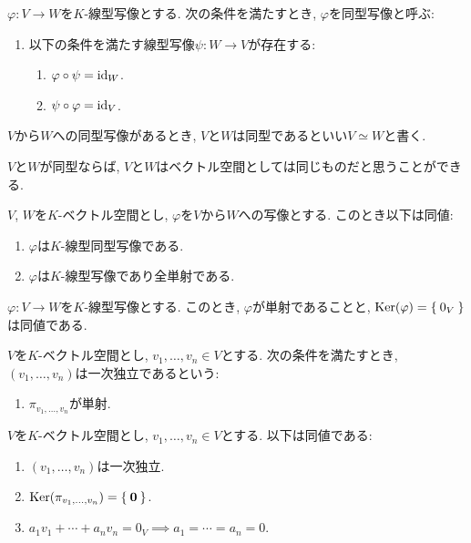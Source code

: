 \begin{definition}
  $\varphi\colon V\to W$を$K$-線型写像とする.
  次の条件を満たすとき, $\varphi$を同型写像と呼ぶ:
  \begin{enumerate}
  \item 以下の条件を満たす線型写像$\psi\colon W\to V$が存在する:
    \begin{enumerate}
      \item $\varphi\circ \psi=\operatorname{id}_W$.
      \item $\psi\circ \varphi=\operatorname{id}_V$.
    \end{enumerate}
  \end{enumerate}
  $V$から$W$への同型写像があるとき,
  $V$と$W$は同型であるといい$V\simeq W$と書く.
\end{definition}

\begin{remark}
  $V$と$W$が同型ならば,
  $V$と$W$はベクトル空間としては同じものだと思うことができる.
\end{remark}
\begin{prop}
  $V$, $W$を$K$-ベクトル空間とし,
  $\varphi$を$V$から$W$への写像とする.
  このとき以下は同値:
  \begin{enumerate}
  \item $\varphi$は$K$-線型同型写像である.
  \item $\varphi$は$K$-線型写像であり全単射である.
  \end{enumerate}
\end{prop}
\begin{prop}
  $\varphi\colon V\to W$を$K$-線型写像とする.
  このとき, $\varphi$が単射であることと,
  $\operatorname{Ker}(\varphi)=\Set{0_V}$は同値である.
\end{prop}
\begin{definition}
  $V$を$K$-ベクトル空間とし,
  $v_1,\ldots,v_n\in V$とする.
  次の条件を満たすとき,
  $(v_1,\ldots,v_n)$は一次独立であるという:
  \begin{enumerate}
    \item $\pi_{v_1,\ldots,v_n}$が単射.
  \end{enumerate}
\end{definition}
\begin{remark}
  $V$を$K$-ベクトル空間とし,
  $v_1,\ldots,v_n\in V$とする.
  以下は同値である:
  \begin{enumerate}
  \item $(v_1,\ldots,v_n)$は一次独立.
  \item $\operatorname{Ker}(\pi_{v_1,\ldots,v_n})=\Set{\boldsymbol{0}}$.
  \item $a_1v_1+\cdots+a_nv_n=0_V\implies a_1=\cdots=a_n=0$.
  \end{enumerate}
\end{remark}
